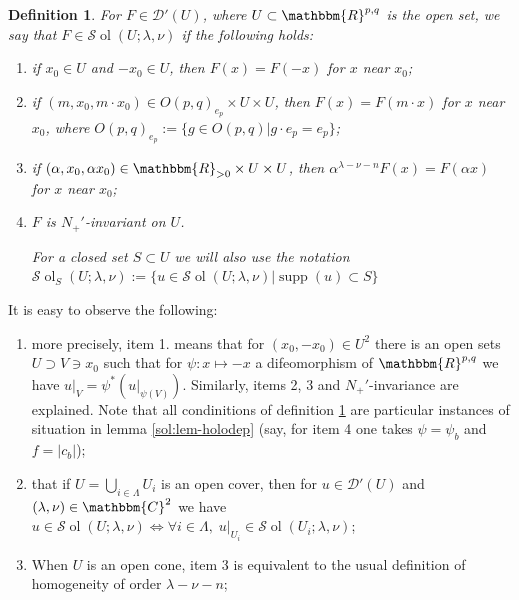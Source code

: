 \documentclass{article}
\newcommand{\assign}{:=}
\newcommand{\tmop}[1]{\ensuremath{\operatorname{#1}}}
\newtheorem{definition}{Definition}
\numberwithin{definition}{section}
\numberwithin{lemma}{section}
\numberwithin{proposition}{section}
{\theorembodyfont{\rmfamily}\newtheorem{remark}{Remark}
\numberwithin{remark}{section}
}
\newcommand{\D}{\mathcal{D}} \newcommand{\supp}{supp}
\begin{document}
\begin{definition}
  \label{sol:def-sol}For $F \in \D' (U)$, where $U \subset \mathbbm{R}^{p, q}$
  is the open set, we say that $F \in \mathcal{S} \tmop{ol} (U ; \lambda,
  \nu)$ if the following holds:
  \begin{enumerate}
    \item if $x_0 \in U$ and $- x_0 \in U$, then $F (x) = F (- x)$ for $x$
    near $x_0$;
    
    \item if $(m, x_0, m \cdot x_0) \in O (p, q)_{e_p} \times U \times U$,
    then $F (x) = F (m \cdot x)$ for $x$ near $x_0$, where $O (p, q)_{e_p}
    \assign \{g \in O (p, q) |g \cdot e_p = e_p \}$;
    
    \item if $(\alpha, x_0, \alpha x_0) \in \mathbbm{R}_{> 0} \times U \times
    U$, then $\alpha^{\lambda - \nu - n} F (x) = F (\alpha x)$ for $x$ near
    $x_0$;
    
    \item $F$ is $N_+'$-invariant on $U$.{
    
    }{
    
    }For a closed set $S \subset U$ we will also use the notation $\mathcal{S}
    \tmop{ol}_S ( U ; \lambda, \nu) \assign \{ u \in \mathcal{S} \tmop{ol} ( U
    ; \lambda, \nu) | \tmop{supp} ( u) \subset S \}$
  \end{enumerate}
\end{definition}

\begin{remark}
  It is easy to observe the following:
  \begin{enumerate}
    \item more precisely, item 1. means that for $( x_0, - x_0) \in U^2$ there
    is an open sets $U \supset V \ni x_0$ such that for $\psi : x \mapsto - x$
    a difeomorphism of $\mathbbm{R}^{p, q}$ we have $u |_V = \psi^{\ast} ( u
    |_{\psi ( V)})$. Similarly, items 2, 3 and $N_+'$-invariance are
    explained. Note that all condinitions of definition \ref{sol:def-sol} are
    particular instances of situation in lemma \ref{sol:lem-holodep} (say, for
    item 4 one takes $\psi = \psi_b$ and $f = | c_b |$);
    
    \item that if $U = \bigcup_{i \in \Lambda} U_i$ is an open cover, then for
    $u \in \mathcal{D}' ( U)$ and $( \lambda, \nu) \in \mathbbm{C}^2$ we have
    $u \in \mathcal{S} \tmop{ol} ( U ; \lambda, \nu) \Leftrightarrow \forall i
    \in \Lambda, \; u |_{U_i} \in \mathcal{S} \tmop{ol} ( U_i ; \lambda,
    \nu)$;
    
    \item When $U$ is an open cone, item 3 is equivalent to the usual
    definition of homogeneity of order $\lambda - \nu - n$;
  \end{enumerate}
\end{remark}
\end{document}
